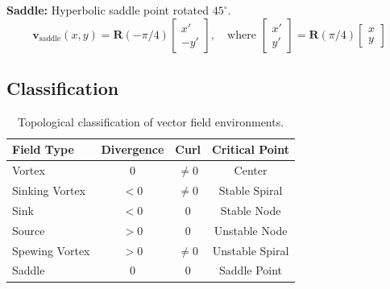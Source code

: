 \textbf{Saddle:} Hyperbolic saddle point rotated $45^\circ$.
\begin{equation}
\mathbf{v}_{\text{saddle}}(x, y) = \mathbf{R}(-\pi/4) \begin{bmatrix} x' \\ -y' \end{bmatrix}, \quad \text{where } \begin{bmatrix} x' \\ y' \end{bmatrix} = \mathbf{R}(\pi/4) \begin{bmatrix} x \\ y \end{bmatrix}
\end{equation}

\subsection{Classification}

\begin{table}[h]
\centering
\begin{tabular}{lccc}
\hline
\textbf{Field Type} & \textbf{Divergence} & \textbf{Curl} & \textbf{Critical Point} \\
\hline
Vortex & 0 & $\neq 0$ & Center \\
Sinking Vortex & $< 0$ & $\neq 0$ & Stable Spiral \\
Sink & $< 0$ & 0 & Stable Node \\
Source & $> 0$ & 0 & Unstable Node \\
Spewing Vortex & $> 0$ & $\neq 0$ & Unstable Spiral \\
Saddle & 0 & 0 & Saddle Point \\
\hline
\end{tabular}
\caption{Topological classification of vector field environments.}
\label{tab:field_summary}
\end{table}

